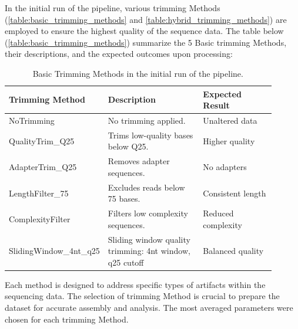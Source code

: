 In the initial run of the pipeline, various \gls{trimming} Methods (\autoref{table:basic_trimming_methods} and \autoref{table:hybrid_trimming_methods}) are employed to ensure the highest quality of the sequence data. The table below (\autoref{table:basic_trimming_methods}) summarize the 5 Basic \gls{trimming} Methods, their descriptions, and the expected outcomes upon processing:

\begin{table}[H]
\centering
\begin{tabular}{p{0.2\linewidth} p{0.4\linewidth} p{0.3\linewidth}}
\hline
\textbf{Trimming Method} & \textbf{Description} & \textbf{Expected Result} \\ \hline
NoTrimming & No trimming applied. & Unaltered data \\
QualityTrim\_Q25 & Trims low-quality bases below Q25. & Higher quality \\
AdapterTrim\_Q25 & Removes adapter sequences. & No adapters \\
LengthFilter\_75 & Excludes reads below 75 bases. & Consistent length \\
ComplexityFilter & Filters low complexity sequences. & Reduced complexity \\
SlidingWindow\newline\_4nt\_q25 & Sliding window quality trimming: 4nt window, q25 cutoff & Balanced quality \\
\hline
\end{tabular}
\caption{Basic Trimming Methods in the initial run of the pipeline.}
\label{table:basic_trimming_methods}
\end{table}

Each method is designed to address specific types of artifacts within the sequencing data. The selection of \gls{trimming} Method is crucial to prepare the dataset for accurate assembly and analysis. The most averaged parameters were chosen for each \gls{trimming} Method.

